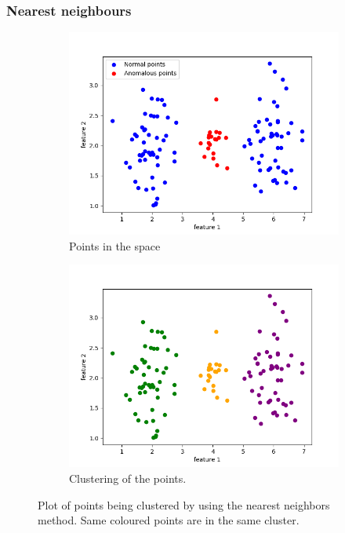 \documentclass[oneside, a4paper, onecolumn, 11pt]{article}
\begin{document}
\subsubsection{Nearest neighbours}
\begin{figure}[H]
  \centering
  \begin{subfigure}{0.35\textwidth}
      \centering
      \includegraphics[width=\linewidth]{images/clustnn.png}
      \caption{Points in the space}
  \end{subfigure}
  \begin{subfigure}{0.35\textwidth}
      \centering
      \includegraphics[width=\linewidth]{images/actual_nn.png}
      \caption{Clustering of the points.}
  \end{subfigure}
  \caption{Plot of points being clustered by using the nearest neighbors method. Same coloured points are in the same cluster.}
  \label{fig:nn_sep}
\end{figure}
\end{document}
